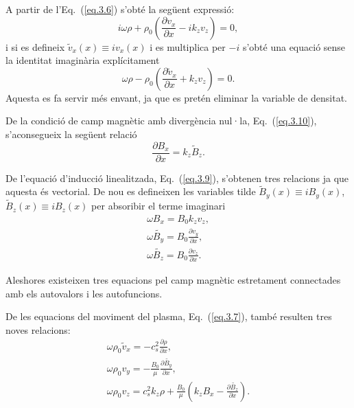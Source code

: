\documentclass[12pt,a4paper]{article}
\numberwithin{equation}{section}
\begin{document}
A partir de l'Eq.~(\ref{eq.3.6}) s'obté la següent expressió:
\begin{equation}
    i \omega \rho + \rho_0 \left( \frac{\partial v_{x}}{\partial x} - i k_z v_{z} \right) = 0, \tag{3.21} \label{eq.3.21}
\end{equation}
i si es defineix ${\tilde{v}_{x}}(x) \equiv i {v}_{x}(x)$ i es multiplica per $-i$ s'obté una equació sense la identitat imaginària explícitament
\begin{equation}
    \omega \rho - \rho_0 \left( \frac{\partial \tilde{v}_{x}}{\partial x} + k_z v_{z} \right) = 0. \tag{3.22} \label{eq.3.22}
\end{equation}
Aquesta es fa servir més envant, ja que es pretén eliminar la variable de densitat.

De la condició de camp magnètic amb divergència nul·la, Eq.~(\ref{eq.3.10}), s'aconsegueix la següent relació
\begin{equation}
    \frac{\partial B_{x}}{\partial x} = k_z \tilde{B}_{z}. \tag{3.23} \label{eq.3.23}
\end{equation}

De l'equació d'inducció linealitzada, Eq.~(\ref{eq.3.9}), s'obtenen tres relacions ja que aquesta és vectorial.
De nou es defineixen les variables tilde ${\tilde{B}_{y}}(x) \equiv i {B}_{y}(x)$, ${\tilde{B}_{z}}(x) \equiv i {B}_{z}(x)$ per absoribir el terme imaginari
\begin{gather}
    \omega B_{x} = B_0 k_z v_{z}, \tag{3.24} \label{eq.3.24} \\
    \omega \tilde{B_{y}} = B_0 \frac{\partial v_{y}}{\partial x}, \tag{3.25} \label{eq.3.25} \\
    \omega \tilde{B_{z}} = B_0 \frac{\partial v_{z}}{\partial x}. \tag{3.26} \label{eq.3.26}
\end{gather}

Aleshores existeixen tres equacions pel camp magnètic estretament connectades amb els autovalors i les autofuncions.

De les equacions del moviment del plasma, Eq.~(\ref{eq.3.7}), també resulten tres noves relacions:
\begin{gather}
    \omega \rho_0 \tilde{v}_{x} = - c_s^2 \frac{\partial \rho}{\partial x}, \tag{3.27} \label{eq.3.27} \\
    \omega \rho_0 v_{y} = - \frac{B_0}{\mu} \frac{\partial \tilde{B_{y}}}{\partial x}, \tag{3.28} \label{eq.3.28} \\
    \omega \rho_0 v_{z} = c_s^2 k_z \rho + \frac{B_0}{\mu} \left( k_z B_{x} - \frac{\partial \tilde{B_{z}}}{\partial x} \right). \tag{3.29} \label{eq.3.29}
\end{gather}
\end{document}
